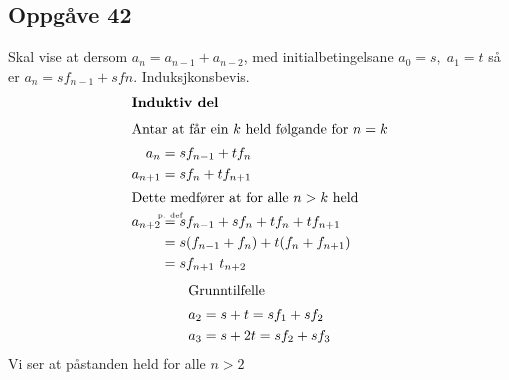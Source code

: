\documentclass[a4paper, 11pt]{article}
\newcommand{\ceq}[1]{\stackrel{\mathclap{\tiny\mbox{#1}}}{=}}
\begin{document}
\subsection*{Oppgåve 42}
Skal vise at dersom \(a_n = a_{n-1} + a_{n-2}\), med initialbetingelsane \(a_0 = s, \; a_1 = t\)  så er
\(a_n = sf_{n-1} + sfn\). Induksjkonsbevis.
\begin{align*}
    \intertext{\bf Induktiv del}
    \intertext{Antar at får ein \(k\) held følgande for \(n = k\)}
    a_n &= sf_{n-1} + tf_n \\
    a_{n+1} &= sf_n + tf_{n+1} \\
    \intertext{Dette medfører at for alle \(n > k\) held}
    a_{n+2} &\ceq{p. def} sf_{n-1} + sf_n + tf_n + tf_{n+1} \\
    &= s(f_{n-1} + f_n) + t(f_n + f_{n+1}) \\
    &= sf_{n+1} \ t_{n+2}
\end{align*}
\begin{align*}
    \intertext{Grunntilfelle}
    a_2 &= s + t = sf_1 + sf_2 \\
    a_3 &= s + 2t = sf_2 + sf_3\\
\end{align*}
Vi ser at påstanden held for alle \(n > 2\)
\end{document}
